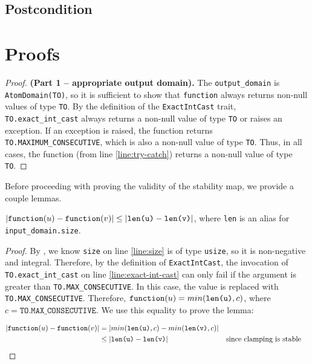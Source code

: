 \documentclass{article}
\begin{document}
\subsection*{Postcondition}

\section{Proofs}

\begin{proof} \textbf{(Part 1 -- appropriate output domain).}
    The \texttt{output\_domain} is \texttt{AtomDomain(TO)}, so it is sufficient to show that \texttt{function} always returns non-null values of type \texttt{TO}.
    By the definition of the \texttt{ExactIntCast} trait, \texttt{TO.exact\_int\_cast} always returns a non-null value of type \texttt{TO} or raises an exception.
    If an exception is raised, the function returns \texttt{TO.MAXIMUM\_CONSECUTIVE}, which is also a non-null value of type \texttt{TO}.
    Thus, in all cases, the function (from line \ref{line:try-catch}) returns a non-null value of type \texttt{TO}.
\end{proof}

Before proceeding with proving the validity of the stability map, we provide a couple lemmas.

\begin{lemma}
    \label{dsym-sens}
    $|\texttt{function}(u) - \texttt{function}(v)| \leq |\texttt{len(u)} - \texttt{len(v)}|$,
    where \texttt{len} is an alias for \\ \texttt{input\_domain.size}.
\end{lemma}

\begin{proof}
    By , we know \texttt{size} on line \ref{line:size} is of type \texttt{usize},
    so it is non-negative and integral.
    Therefore, by the definition of \texttt{ExactIntCast},
    the invocation of \texttt{TO.exact\_int\_cast} on line \ref{line:exact-int-cast} can only fail if the argument is greater than \texttt{TO.MAX\_CONSECUTIVE}.
    In this case, the value is replaced with \texttt{TO.MAX\_CONSECUTIVE}.
    Therefore, $\texttt{function}(u) = min(\texttt{len(u)}, c)$, where $c = \texttt{TO.MAX\_CONSECUTIVE}$.
    We use this equality to prove the lemma:

    \begin{align*}
        |\texttt{function}(u) - \texttt{function}(v)| &= |min(\texttt{len(u)}, c) - min(\texttt{len(v)}, c)| \\
        &\leq |\texttt{len(u)} - \texttt{len(v)}| &&\text{since clamping is stable} \\
    \end{align*}
\end{proof}
\end{document}

